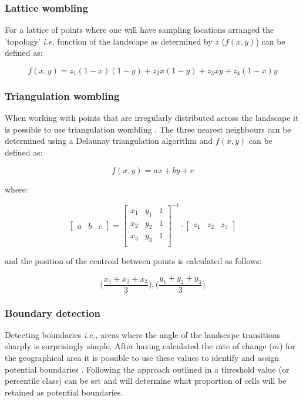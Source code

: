 \subsubsection{Lattice wombling}

For a lattice of points where one will have sampling locations arranged
the 'topology' \emph{i.e.} function of the landscape as determined by $z$ ($f(x,y)$) can be defined as:

$$f(x,y) = z_{1}(1-x)(1-y) + z_{2}x(1-y) + z_{3}x y + z_{4}(1-x)y$$

\subsubsection{Triangulation wombling}

When working with points that are irregularly distributed across the landscape it is possible to use triangulation wombling \cite{Fortin1995DelEco}. The three nearest neighbours can be determined using a Delaunay triangulation algorithm \cite{Delaunay1934SphVid} and $f(x,y)$ can be defined as:

$$f(x,y) = ax + by + c$$

where:

$$ \left[ \begin{array}{ccc} a & b & c \end{array} \right] = 
\left[ {\begin{array}{ccc}
   x_{1} & y_{1} & 1\\
   x_{2} & y_{2} & 1\\
   x_{3} & y_{3} & 1\\
  \end{array} } \right]^{-1}\cdot
  \left[
  \begin{array}{ccc} z_{1} & z_{2} & z_{3} \end{array} \right]$$

and the position of the centroid between points is calculated as follows:

$$ \Big( \frac{x_{1} + x_{2} + x_{3}}{3} \Big), \Big( \frac{y_{1} + y_{2} +
y_{3}}{3} \Big) $$

\subsubsection{Boundary detection}

Detecting boundaries \emph{i.e.,} areas where the angle of the landscape
transitions sharply is surprisingly simple. After having calculated the
rate of change (\(m\)) for the geographical area it is possible to use
these values to identify and assign potential boundaries
\cite{Fortin2005SpaAna, Oden1993CatWom, Fortin1995DelEco}. Following the
approach outlined in \cite{Fortin2005SpaAna} a threshold value (or
percentile class) can be set and will determine what proportion of cells
will be retained as potential boundaries.

